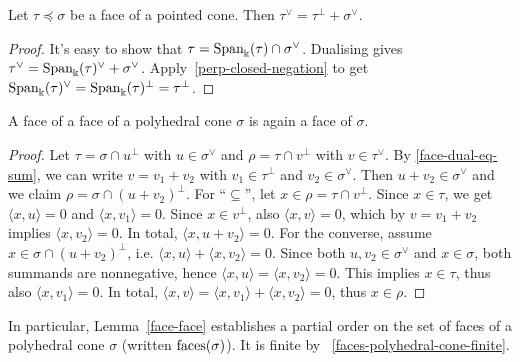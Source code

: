 \begin{lemma}
  \label{face-dual-eq-sum}
  Let \( \tau \preceq \sigma \) be a face of a pointed cone. Then \(
  \tau^{\vee} = \tau^{\perp} + \sigma^{\vee} \).
\end{lemma}
\begin{proof}
  It's easy to show that \( \tau = \operatorname{Span}_{\Bbbk}(\tau) \cap
  \sigma^{\vee} \). Dualising gives \( \tau^{\vee} =
  \operatorname{Span}_{\Bbbk}(\tau)^{\vee} + \sigma^{\vee} \).
  Apply~\ref{perp-closed-negation} to get \(
  \operatorname{Span}_{\Bbbk}(\tau)^{\vee} = \operatorname{Span}_{\Bbbk}(\tau)^{\perp} =
  \tau^{\perp} \).
\end{proof}


\begin{lemma}
  \label{face-face}
  A face of a face of a polyhedral cone \( \sigma \) is again a face
  of \( \sigma \).
\end{lemma}
\begin{proof}
  Let \( \tau = \sigma \cap u^{\perp} \) with \( u \in \sigma^{\vee}
  \) and \( \rho = \tau \cap v^{\perp} \) with \( v \in \tau^{\vee}
  \). By \ref{face-dual-eq-sum}, we can write \( v = v_1 + v_2 \)
  with \( v_1 \in \tau^{\perp} \) and \( v_2 \in \sigma^{\vee} \).
  Then \( u + v_2 \in \sigma^{\vee} \) and we claim \( \rho = \sigma
  \cap (u + v_2)^{\perp} \). For ``\( \subseteq \)'', let \( x \in
  \rho = \tau \cap v^{\perp} \). Since \( x \in \tau \), we get \(
  \langle x, u \rangle = 0 \) and \( \langle x, v_1 \rangle = 0 \).
  Since \( x \in v^{\perp} \), also \( \langle x, v \rangle = 0 \),
  which by \( v = v_1 + v_2 \) implies \( \langle x, v_2 \rangle = 0
  \). In total, \( \langle x, u + v_2 \rangle = 0 \). For the
  converse, assume \( x \in \sigma \cap (u + v_2)^{\perp} \), i.e. \(
  \langle x, u \rangle + \langle x, v_2 \rangle = 0 \). Since both \(
  u, v_2 \in \sigma^{\vee} \) and \( x \in \sigma \), both summands
  are nonnegative, hence \( \langle x, u \rangle = \langle x, v_2
  \rangle = 0 \). This implies \( x \in \tau \), thus also \( \langle
  x, v_1 \rangle = 0 \). In total, \( \langle x, v \rangle = \langle
  x, v_1 \rangle + \langle x, v_2 \rangle = 0 \), thus \( x \in \rho
  \).
\end{proof}

In particular, Lemma~\ref{face-face} establishes a partial order on
the set of faces of a polyhedral cone \( \sigma \) (written \(
\operatorname{faces}(\sigma) \)). It is finite by
~\ref{faces-polyhedral-cone-finite}.

